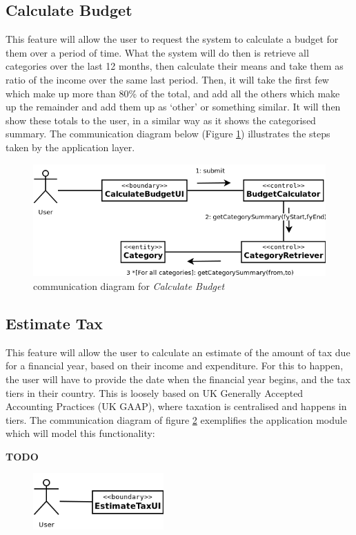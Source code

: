 \subsection{Calculate Budget} \label{sec:AnalysisAndDesign.CalculateBudget}
This feature will allow the user to request the system to calculate a budget
for them over a period of time. What the system will do then is retrieve all
categories over the last 12 months, then calculate their means and take them as
ratio of the income over the same last period. Then, it will take the first few
which make up more than 80\% of the total, and add all the others which make up
the remainder and add them up as `other' or something similar. It will then
show these totals to the user, in a similar way as it shows the categorised
summary. The communication diagram below (Figure
\ref{fig:CommDiagram.CalculateBudget}) illustrates the steps taken by the
application layer.
\begin{figure}[ht!]
  \begin{center}
    \includegraphics[width=14cm]{./contents/img/Comm_Diagram_-_Calculate_Budget.png}
  \end{center}
  \caption{communication diagram for \emph{Calculate Budget}}
  \label{fig:CommDiagram.CalculateBudget}
\end{figure}
\FloatBarrier



\subsection{Estimate Tax} \label{sec:AnalysisAndDesign.EstimateTax}

This feature will allow the user to calculate an estimate of the amount of tax
due for a financial year, based on their income and expenditure. For this to
happen, the user will have to provide the date when the financial year begins,
and the tax tiers in their country. This is loosely based on UK Generally
Accepted Accounting Practices (UK GAAP), where taxation is centralised and
happens in tiers. The communication diagram of figure
\ref{fig:CommDiagram.EstimateTax} exemplifies the application module which will
model this functionality:

\textbf{TODO}

\begin{figure}[ht!]
  \begin{center}
    \includegraphics[width=5cm]{./contents/img/Comm_Diagram_-_Estimate_Tax.png}
  \end{center}
  \caption{}
  \label{fig:CommDiagram.EstimateTax}
\end{figure}
\FloatBarrier
